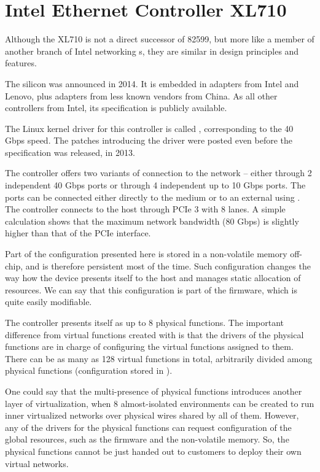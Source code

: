 \section{Intel Ethernet Controller XL710}
\label{nic:xl710}
\renewcommand{\sect}[1]{\cite[#1]{XL710}}


Although the XL710 is not a direct successor of 82599, but more like a member
of another branch of Intel networking s, they are similar in design
principles and features.

The silicon was announced in 2014. It is embedded in adapters from Intel and
Lenovo, plus adapters from less known vendors from China. As all other controllers from
Intel, its specification \cite{XL710} is publicly available.

The Linux kernel driver for this controller is called , corresponding
to the 40 Gbps speed. The patches introducing the driver were posted even
before the specification was released, in 2013.

The controller offers two variants of connection to the network -- either
through 2 independent 40 Gbps ports or through 4 independent up to 10 Gbps
ports. The ports can be connected either directly to the medium or to an
external  using . The controller connects to the host through
PCIe 3 with 8 lanes. A simple calculation shows that the maximum network
bandwidth (80 Gbps) is slightly higher than that of the PCIe interface.

Part of the configuration presented here is stored in a non-volatile memory
off-chip, and is therefore persistent most of the time. Such configuration
changes the way how the device presents itself to the host and manages static
allocation of resources. We can say that this configuration is part of the
firmware, which is quite easily modifiable.

The controller presents itself as up to 8 physical functions. The important
difference from virtual functions created with  is that the drivers
of the physical functions are in charge of configuring the virtual functions
assigned to them. There can be as many as 128 virtual functions in total,
arbitrarily divided among physical functions (configuration stored in ).

One could say that the multi-presence of physical functions introduces another
layer of virtualization, when 8 almost-isolated environments can be created to
run inner virtualized networks over physical wires shared by all of them.
However, any of the drivers for the physical functions can request
configuration of the global resources, such as the firmware and the
non-volatile memory. So, the physical functions cannot be just handed out to
customers to deploy their own virtual networks.

